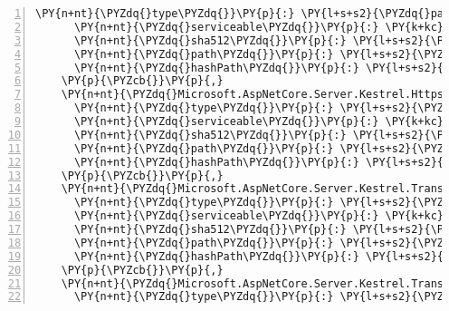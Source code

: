 \begin{Verbatim}[commandchars=\\\{\},numbers=left,firstnumber=1,stepnumber=1,numberblanklines=0]
      \PY{n+nt}{\PYZdq{}type\PYZdq{}}\PY{p}{:} \PY{l+s+s2}{\PYZdq{}package\PYZdq{}}\PY{p}{,}
      \PY{n+nt}{\PYZdq{}serviceable\PYZdq{}}\PY{p}{:} \PY{k+kc}{true}\PY{p}{,}
      \PY{n+nt}{\PYZdq{}sha512\PYZdq{}}\PY{p}{:} \PY{l+s+s2}{\PYZdq{}sha512\PYZhy{}8WUaX2oZn7k4rIpSwC5R0Ry+nL/z/eT0NtrEKpwiPosluASS1IVYZxIBHofsolLN+pG78V5NJsYDNmRiHA0FGQ==\PYZdq{}}\PY{p}{,}
      \PY{n+nt}{\PYZdq{}path\PYZdq{}}\PY{p}{:} \PY{l+s+s2}{\PYZdq{}microsoft.aspnetcore.server.kestrel.core/2.1.0\PYZhy{}rc1\PYZhy{}final\PYZdq{}}\PY{p}{,}
      \PY{n+nt}{\PYZdq{}hashPath\PYZdq{}}\PY{p}{:} \PY{l+s+s2}{\PYZdq{}microsoft.aspnetcore.server.kestrel.core.2.1.0\PYZhy{}rc1\PYZhy{}final.nupkg.sha512\PYZdq{}}
    \PY{p}{\PYZcb{}}\PY{p}{,}
    \PY{n+nt}{\PYZdq{}Microsoft.AspNetCore.Server.Kestrel.Https/2.1.0\PYZhy{}rc1\PYZhy{}final\PYZdq{}}\PY{p}{:} \PY{p}{\PYZob{}}
      \PY{n+nt}{\PYZdq{}type\PYZdq{}}\PY{p}{:} \PY{l+s+s2}{\PYZdq{}package\PYZdq{}}\PY{p}{,}
      \PY{n+nt}{\PYZdq{}serviceable\PYZdq{}}\PY{p}{:} \PY{k+kc}{true}\PY{p}{,}
      \PY{n+nt}{\PYZdq{}sha512\PYZdq{}}\PY{p}{:} \PY{l+s+s2}{\PYZdq{}sha512\PYZhy{}A0QN4L61L54WwF7PdW1UGTD7/qF5MSQIukGYkYGTfJQGwRf7p+rS0+78//S39sdhRVscVv75+XVtG6cNZJwT3w==\PYZdq{}}\PY{p}{,}
      \PY{n+nt}{\PYZdq{}path\PYZdq{}}\PY{p}{:} \PY{l+s+s2}{\PYZdq{}microsoft.aspnetcore.server.kestrel.https/2.1.0\PYZhy{}rc1\PYZhy{}final\PYZdq{}}\PY{p}{,}
      \PY{n+nt}{\PYZdq{}hashPath\PYZdq{}}\PY{p}{:} \PY{l+s+s2}{\PYZdq{}microsoft.aspnetcore.server.kestrel.https.2.1.0\PYZhy{}rc1\PYZhy{}final.nupkg.sha512\PYZdq{}}
    \PY{p}{\PYZcb{}}\PY{p}{,}
    \PY{n+nt}{\PYZdq{}Microsoft.AspNetCore.Server.Kestrel.Transport.Abstractions/2.1.0\PYZhy{}rc1\PYZhy{}final\PYZdq{}}\PY{p}{:} \PY{p}{\PYZob{}}
      \PY{n+nt}{\PYZdq{}type\PYZdq{}}\PY{p}{:} \PY{l+s+s2}{\PYZdq{}package\PYZdq{}}\PY{p}{,}
      \PY{n+nt}{\PYZdq{}serviceable\PYZdq{}}\PY{p}{:} \PY{k+kc}{true}\PY{p}{,}
      \PY{n+nt}{\PYZdq{}sha512\PYZdq{}}\PY{p}{:} \PY{l+s+s2}{\PYZdq{}sha512\PYZhy{}cHov2KIVDG+SWs7W5Huiu4r3K9bMM60sIEMwa/JYKqmXfCW+rQnVi1G1OwSb2w7vnGV9lvlkhOjGwG7Zr0iXJw==\PYZdq{}}\PY{p}{,}
      \PY{n+nt}{\PYZdq{}path\PYZdq{}}\PY{p}{:} \PY{l+s+s2}{\PYZdq{}microsoft.aspnetcore.server.kestrel.transport.abstractions/2.1.0\PYZhy{}rc1\PYZhy{}final\PYZdq{}}\PY{p}{,}
      \PY{n+nt}{\PYZdq{}hashPath\PYZdq{}}\PY{p}{:} \PY{l+s+s2}{\PYZdq{}microsoft.aspnetcore.server.kestrel.transport.abstractions.2.1.0\PYZhy{}rc1\PYZhy{}final.nupkg.sha512\PYZdq{}}
    \PY{p}{\PYZcb{}}\PY{p}{,}
    \PY{n+nt}{\PYZdq{}Microsoft.AspNetCore.Server.Kestrel.Transport.Sockets/2.1.0\PYZhy{}rc1\PYZhy{}final\PYZdq{}}\PY{p}{:} \PY{p}{\PYZob{}}
      \PY{n+nt}{\PYZdq{}type\PYZdq{}}\PY{p}{:} \PY{l+s+s2}{\PYZdq{}package\PYZdq{}}\PY{p}{,}

\end{Verbatim}
